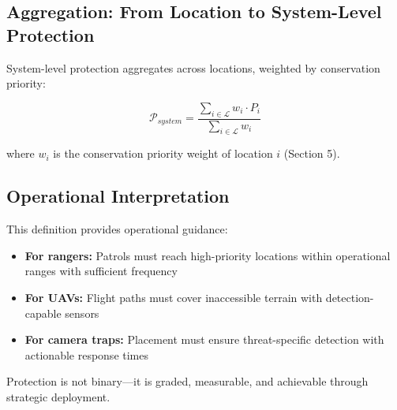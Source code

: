 \subsection{Aggregation: From Location to System-Level Protection}

System-level protection aggregates across locations, weighted by conservation priority:

\begin{equation}
\mathcal{P}_{system} = \frac{\sum_{i \in \mathcal{L}} w_i \cdot P_i}{\sum_{i \in \mathcal{L}} w_i}
\label{eq:system_protection}
\end{equation}

where $w_i$ is the conservation priority weight of location $i$ (Section 5).

\subsection{Operational Interpretation}

This definition provides operational guidance:
\begin{itemize}
\item \textbf{For rangers:} Patrols must reach high-priority locations within operational ranges with sufficient frequency
\item \textbf{For UAVs:} Flight paths must cover inaccessible terrain with detection-capable sensors
\item \textbf{For camera traps:} Placement must ensure threat-specific detection with actionable response times
\end{itemize}

Protection is not binary—it is graded, measurable, and achievable through strategic deployment.

